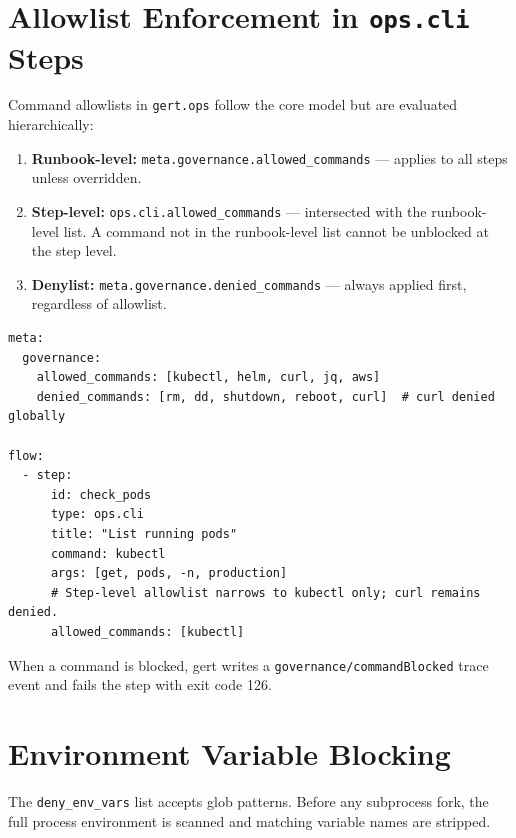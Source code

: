 \section{Allowlist Enforcement in \texttt{ops.cli} Steps}
\label{sec:governance-allowlist}

Command allowlists in \texttt{gert.ops} follow the core model but are evaluated hierarchically:

\begin{enumerate}
  \item \textbf{Runbook-level:} \texttt{meta.governance.allowed\_commands} — applies to all
    steps unless overridden.
  \item \textbf{Step-level:} \texttt{ops.cli.allowed\_commands} — intersected with the
    runbook-level list. A command not in the runbook-level list cannot be unblocked at the
    step level.
  \item \textbf{Denylist:} \texttt{meta.governance.denied\_commands} — always applied first,
    regardless of allowlist.
\end{enumerate}

\begin{verbatim}
meta:
  governance:
    allowed_commands: [kubectl, helm, curl, jq, aws]
    denied_commands: [rm, dd, shutdown, reboot, curl]  # curl denied globally

flow:
  - step:
      id: check_pods
      type: ops.cli
      title: "List running pods"
      command: kubectl
      args: [get, pods, -n, production]
      # Step-level allowlist narrows to kubectl only; curl remains denied.
      allowed_commands: [kubectl]
\end{verbatim}

When a command is blocked, gert writes a \texttt{governance/commandBlocked} trace event and
fails the step with exit code 126.

\section{Environment Variable Blocking}
\label{sec:governance-env-blocking}

The \texttt{deny\_env\_vars} list accepts glob patterns. Before any subprocess fork, the
full process environment is scanned and matching variable names are stripped.

